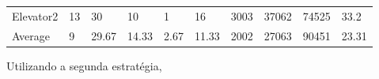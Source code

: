 \documentclass[a4paper]{article}
\begin{document}
\begin{table}[h]
\begin{tabular}{@{}llllllllll@{}}
Elevator2 & 13        & 30            & 10           & 1                                                               & 16                                                                  & 3003                                                         & 37062                                                 & 74525                                                   & 33.2         \\
Average   & 9     & 29.67         & 14.33        & 2.67                                                               & 11.33                                                               & 2002                                                         & 27063                                                 & 90451                                                   & 23.31          \\ \bottomrule
\end{tabular}
\end{table}

Utilizando a segunda estratégia,
\end{document}
